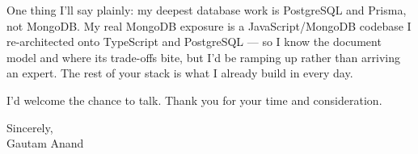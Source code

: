 \documentclass[letterpaper,11pt]{article}
\begin{document}
One thing I'll say plainly: my deepest database work is PostgreSQL and Prisma, not MongoDB. My real MongoDB exposure is a JavaScript/MongoDB codebase I re-architected onto TypeScript and PostgreSQL --- so I know the document model and where its trade-offs bite, but I'd be ramping up rather than arriving an expert. The rest of your stack is what I already build in every day.

I'd welcome the chance to talk. Thank you for your time and consideration.

\vspace{6pt}

Sincerely, \\
Gautam Anand
\end{document}

